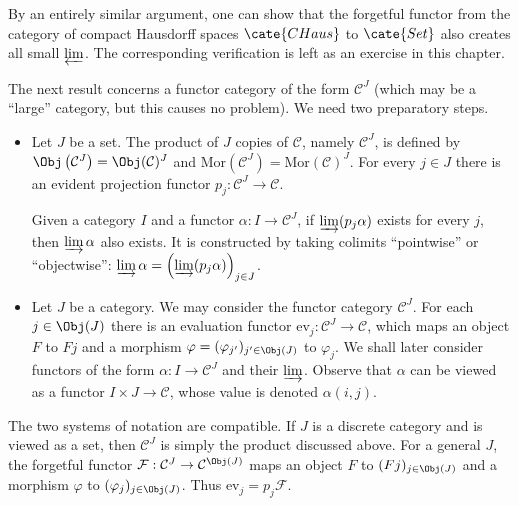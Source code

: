 By an entirely similar argument, one can show that the forgetful functor from
the category of compact Hausdorff spaces $\cate{CHaus}$ to $\cate{Set}$ also
creates all small $\varprojlim$. The corresponding verification is left as an
exercise in this chapter.

The next result concerns a functor category of the form $\mathcal{C}^J$ (which
may be a ``large'' category, but this causes no problem). We need two
preparatory steps.

\begin{itemize}
	\item Let $J$ be a set. The product of $J$ copies of $\mathcal{C}$, namely
	$\mathcal{C}^J$, is defined by
	$\Obj\left(\mathcal{C}^J\right) = \Obj(\mathcal{C})^J$ and
	$\mathrm{Mor}\left(\mathcal{C}^J \right) = \mathrm{Mor}(\mathcal{C})^J$.
	For every $j \in J$ there is an evident projection functor
	$p_j: \mathcal{C}^J \to \mathcal{C}$.

	Given a category $I$ and a functor $\alpha: I \to \mathcal{C}^J$, if
	$\varinjlim (p_j \alpha)$ exists for every $j$, then
	$\varinjlim \alpha$ also exists. It is constructed by taking colimits
	``pointwise'' or ``objectwise'':
	$\varinjlim \alpha = \left( \varinjlim (p_j \alpha) \right)_{j \in J}$.

	\item Let $J$ be a category. We may consider the functor category
	$\mathcal{C}^J$. For each $j \in \Obj(J)$ there is an evaluation functor
	$\mathrm{ev}_j: \mathcal{C}^J \to \mathcal{C}$, which maps an object $F$
	to $Fj$ and a morphism
	$\varphi = (\varphi_{j'})_{j' \in \Obj(J)}$ to $\varphi_j$. We shall later
	consider functors of the form $\alpha: I \to \mathcal{C}^J$ and their
	$\varinjlim$. Observe that $\alpha$ can be viewed as a functor
	$I \times J \to \mathcal{C}$, whose value is denoted $\alpha(i, j)$.
\end{itemize}

The two systems of notation are compatible. If $J$ is a discrete category and
is viewed as a set, then $\mathcal{C}^J$ is simply the product discussed above.
For a general $J$, the forgetful functor
$\mathcal{F}: \mathcal{C}^J \to \mathcal{C}^{\Obj(J)}$ maps an object $F$ to
$(Fj)_{j \in \Obj(J)}$ and a morphism $\varphi$ to
$(\varphi_j)_{j \in \Obj(J)}$. Thus $\mathrm{ev}_j = p_j \mathcal{F}$.

